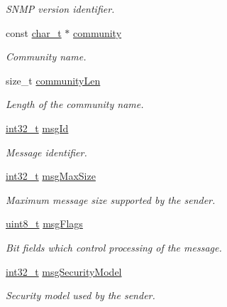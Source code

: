 \begin{DoxyCompactItemize}
\begin{DoxyCompactList}\small\item\em S\+N\+MP version identifier. \end{DoxyCompactList}\item 
const \hyperlink{compiler__port_8h_a40bb5262bf908c328fbcfbe5d29d0201}{char\+\_\+t} $\ast$ \hyperlink{structSnmpMessage_ac9976028507798166e3f542d5806c811}{community}
\begin{DoxyCompactList}\small\item\em Community name. \end{DoxyCompactList}\item 
size\+\_\+t \hyperlink{structSnmpMessage_a828b7eec855d512efcb5262ed979f8fa}{community\+Len}
\begin{DoxyCompactList}\small\item\em Length of the community name. \end{DoxyCompactList}\item 
\hyperlink{stdint_8h_ab1967d8591af1a4e48c37fd2b0f184d0}{int32\+\_\+t} \hyperlink{structSnmpMessage_ab3f065667ee47978ab059eb754f17150}{msg\+Id}
\begin{DoxyCompactList}\small\item\em Message identifier. \end{DoxyCompactList}\item 
\hyperlink{stdint_8h_ab1967d8591af1a4e48c37fd2b0f184d0}{int32\+\_\+t} \hyperlink{structSnmpMessage_a078984d1faa7cb4eb2e7978261c8cba6}{msg\+Max\+Size}
\begin{DoxyCompactList}\small\item\em Maximum message size supported by the sender. \end{DoxyCompactList}\item 
\hyperlink{stdint_8h_aba7bc1797add20fe3efdf37ced1182c5}{uint8\+\_\+t} \hyperlink{structSnmpMessage_a7cc5ff67bc58cd54bf3cf6f3d18879d4}{msg\+Flags}
\begin{DoxyCompactList}\small\item\em Bit fields which control processing of the message. \end{DoxyCompactList}\item 
\hyperlink{stdint_8h_ab1967d8591af1a4e48c37fd2b0f184d0}{int32\+\_\+t} \hyperlink{structSnmpMessage_a868cf2ac7ba0bdb1f756cfaf419cac3c}{msg\+Security\+Model}
\begin{DoxyCompactList}\small\item\em Security model used by the sender. \end{DoxyCompactList}\item 

\end{DoxyCompactItemize}
